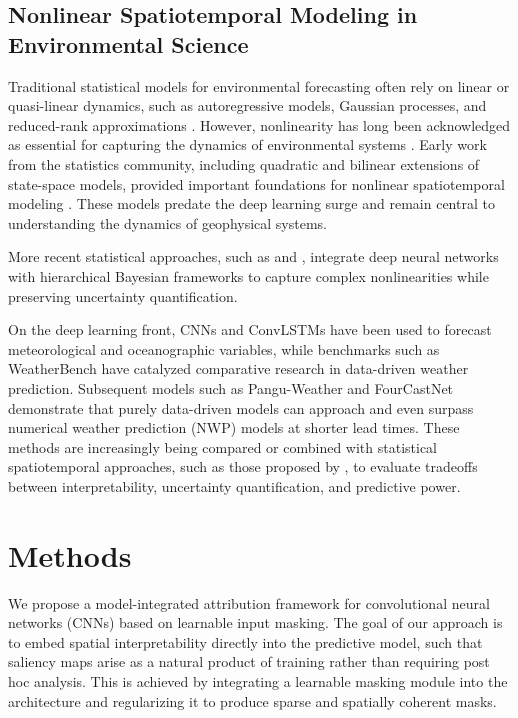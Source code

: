 \documentclass[12pt]{article}
\begin{document}
\subsection{Nonlinear Spatiotemporal Modeling in Environmental Science}

Traditional statistical models for environmental forecasting often rely on linear or quasi-linear dynamics, such as autoregressive models, Gaussian processes, and reduced-rank approximations \citep{banerjee2003hierarchical, cressie2015statistics}. However, nonlinearity has long been acknowledged as essential for capturing the dynamics of environmental systems \citep{wikle2010general}. Early work from the statistics community, including quadratic and bilinear extensions of state-space models, provided important foundations for nonlinear spatiotemporal modeling \citep{wikle2001spatiotemporal}.  These models predate the deep learning surge and remain central to understanding the dynamics of geophysical systems.

More recent statistical approaches, such as \cite{zammit2020deep} and \cite{wikle2023statistical}, integrate deep neural networks with hierarchical Bayesian frameworks to capture complex nonlinearities while preserving uncertainty quantification.

On the deep learning front, CNNs and ConvLSTMs \citep{Shi2015ConvLSTM} have been used to forecast meteorological and oceanographic variables, while benchmarks such as WeatherBench \citep{Rasp2020WeatherBench} have catalyzed comparative research in data-driven weather prediction. Subsequent models such as Pangu-Weather \citep{Bi2023PanguWeather} and FourCastNet \citep{Pathak2022FourCastNet} demonstrate that purely data-driven models can approach and even surpass numerical weather prediction (NWP) models at shorter lead times. These methods are increasingly being compared or combined with statistical spatiotemporal approaches, such as those proposed by \cite{zammit2020deep}, to evaluate tradeoffs between interpretability, uncertainty quantification, and predictive power.


\section{Methods}\label{sec:methods}

We propose a model-integrated attribution framework for convolutional neural networks (CNNs) based on learnable input masking. The goal of our approach is to embed spatial interpretability directly into the predictive model, such that saliency maps arise as a natural product of training rather than requiring post hoc analysis. This is achieved by integrating a learnable masking module into the architecture and regularizing it to produce sparse and spatially coherent masks.
\end{document}
